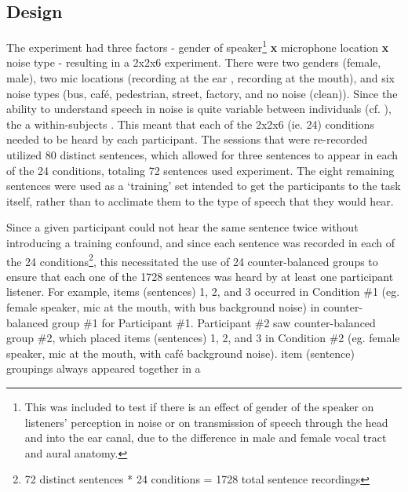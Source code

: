 \subsection{Design}
\label{chap3:methods:design}

The experiment had three factors - gender of speaker\footnote{This was included to test if there is an effect of gender of the speaker on listeners' perception in noise or on transmission of speech through the head and into the ear canal, due to the difference in male and female vocal tract and aural anatomy.} \textbf{x} microphone location \textbf{x} noise type - resulting in a 2x2x6 experiment.  There were two genders (female, male), two mic locations (recording at the ear \DIFaddbegin {}\DIFaddend , recording at the mouth), and six noise types (bus, caf\'{e}, pedestrian, street, factory, and no noise (clean)).  Since the ability to understand speech in noise is quite variable between individuals (cf. \cite{ding:13,gilbert:13}), the \DIFdelbegin {}\DIFdelend \DIFaddbegin {}\DIFaddend a within-subjects \DIFdelbegin {}\DIFdelend \DIFaddbegin {}\DIFaddend .  This meant that each of the 2x2x6 (ie. 24) conditions needed to be heard by each participant.  The sessions that were re-recorded utilized 80 distinct sentences, which allowed for three sentences to appear in each of the 24 conditions, totaling 72 sentences used \DIFdelbegin {}\DIFdelend \DIFaddbegin {}\DIFaddend experiment.  The eight remaining sentences were used as a `training' set intended to get the participants \DIFdelbegin {}\DIFdelend \DIFaddbegin {}\DIFaddend to the task itself, rather than to acclimate them to the type of speech that they would hear.

Since a given participant could not hear the same sentence twice without introducing a training confound, and since each sentence was recorded in each of the 24 conditions\footnote{72 distinct sentences * 24 conditions = 1728 total sentence recordings}, this necessitated the use of 24 counter-balanced groups to ensure that each one of the 1728 sentences was heard by at least one participant listener.  For example, items (sentences) 1, 2, and 3 occurred in Condition \#1 (eg. female speaker, mic at the mouth, with bus background noise) in counter-balanced group \#1 for Participant \#1. Participant \#2 saw counter-balanced group \#2, which placed items (sentences) 1, 2, and 3 in Condition \#2 (eg. female speaker, mic at the mouth, with caf\'{e} background noise).  \DIFdelbegin {}\DIFdelend \DIFaddbegin {}\DIFaddend item (sentence) groupings always appeared together in a \DIFdelbegin {}%

